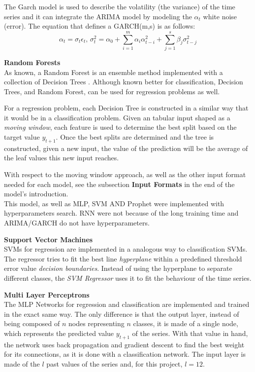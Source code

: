 \documentclass[10pt,twocolumn,letterpaper]{article}
\begin{document}
	
	The Garch model is used to describe the volatility (the variance) of the time series and it can integrate the ARIMA model by modeling the $\alpha_t$ white noise (error). The equation that defines a GARCH(m,s) is as follows:
	\begin{equation}
		\alpha_t=\sigma_t\epsilon_t\mbox{,      }\sigma_t^2=\alpha_0+\sum_{i=1}^{m}\alpha_i\alpha_{t-i}^2+\sum_{j=1}^{s}\beta_j\sigma_{t-j}^2
	\end{equation}
	
	\textbf{Random Forests} \\
	
	As known, a Random Forest is an ensemble method implemented with a collection of Decision Trees \cite{bishop2006pattern}. Although known better for classification, Decision Trees, and Random Forest, can be used for regression problems as well.
	
	For a regression problem, each Decision Tree is constructed in a similar way that it would be in a classification problem. Given an tabular input shaped as a \textit{moving window}, each feature is used to determine the best split based on the target value $y_{t+1}$. Once the best splits are determined and the tree is constructed, given a new input, the value of the prediction will be the average of the leaf values this new input reaches.
	
	With respect to the moving window approach, as well as the other input format needed for each model, see the subsection \textbf{Input Formats} in the end of the model's introduction. \\
	
	This model, as well as MLP, SVM AND Prophet were implemented with hyperparameters search. RNN were not because of the long training time and ARIMA/GARCH do not have hyperparameters.
	
	\textbf{Support Vector Machines} \\
	
	SVMs for regression are implemented in a analogous way to classification SVMs. The  regressor tries to fit  the best line \textit{hyperplane} within a predefined threshold error value \textit{decision boundaries}. Instead of using the hyperplane to separate different classes, the \textit{SVM Regressor} uses it to fit the behaviour of the time series. 
	
	
	\textbf{Multi Layer Perceptrons}\\
	
	The MLP Networks for regression and classification are implemented and trained in the exact same way. The only difference is that the output layer, instead of being composed of $n$ nodes representing $n$ classes, it is made of a single node, which represents the predicted value $y_{t+1}$ of the series. With that value in hand, the network uses back propagation and gradient descent to find the best weight for its connections, as it is done with a classification network. The input layer is made of the $l$ past values of the series and, for this project, $l=12$.\\
	
\end{document}
